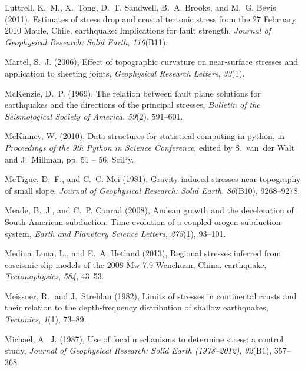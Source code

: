\documentclass[twocolumn,jgrga]{AGUTeX}
\begin{document}
\begin{article}
{{\begin{thebibliography}{87}
Luttrell, K.~M., X.~Tong, D.~T. Sandwell, B.~A. Brooks, and M.~G. Bevis (2011),
  Estimates of stress drop and crustal tectonic stress from the 27 {F}ebruary
  2010 {M}aule, {C}hile, earthquake: Implications for fault strength,
  \textit{Journal of Geophysical Research: Solid Earth}, \textit{116}(B11).

Martel, S.~J. (2006), Effect of topographic curvature on near-surface stresses
  and application to sheeting joints, \textit{Geophysical Research Letters},
  \textit{33}(1).

McKenzie, D.~P. (1969), The relation between fault plane solutions for
  earthquakes and the directions of the principal stresses, \textit{Bulletin of
  the Seismological Society of America}, \textit{59}(2), 591--601.

McKinney, W. (2010), Data structures for statistical computing in python, in
  \textit{Proceedings of the 9th Python in Science Conference}, edited by
  S.~van~der Walt and J.~Millman, pp. 51 -- 56, SciPy.

McTigue, D.~F., and C.~C. Mei (1981), Gravity-induced stresses near topography
  of small slope, \textit{Journal of Geophysical Research: Solid Earth},
  \textit{86}(B10), 9268--9278.

Meade, B.~J., and C.~P. Conrad (2008), Andean growth and the deceleration of
  {S}outh {A}merican subduction: {T}ime evolution of a coupled
  orogen-subduction system, \textit{Earth and Planetary Science Letters},
  \textit{275}(1), 93--101.

Medina~Luna, L., and E.~A. Hetland (2013), Regional stresses inferred from
  coseismic slip models of the 2008 {M}w 7.9 {W}enchuan, {C}hina, earthquake,
  \textit{Tectonophysics}, \textit{584}, 43--53.

Meissner, R., and J.~Strehlau (1982), Limits of stresses in continental crusts
  and their relation to the depth-frequency distribution of shallow
  earthquakes, \textit{Tectonics}, \textit{1}(1), 73--89.

Michael, A.~J. (1987), Use of focal mechanisms to determine stress: a control
  study, \textit{Journal of Geophysical Research: Solid Earth (1978--2012)},
  \textit{92}(B1), 357--368.


\end{thebibliography}}}
\end{article}
\end{document}
